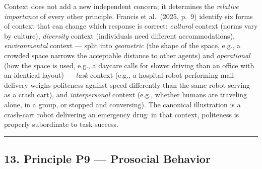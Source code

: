 \documentclass[utf8]{frontiers_suppmat} %
\newenvironment{Shaded}{\begin{shaded}}{\end{shaded}}
\begin{document}
Context does not add a new independent concern; it determines the
\emph{relative importance} of every other principle. Francis et
al.~(2025, p.~9) identify six forms of context that can change which
response is correct: \emph{cultural} context (norms vary by culture),
\emph{diversity} context (individuals need different accommodations),
\emph{environmental} context --- split into \emph{geometric} (the shape
of the space, e.g., a crowded space narrows the acceptable distance to
other agents) and \emph{operational} (how the space is used, e.g., a
daycare calls for slower driving than an office with an identical
layout) --- \emph{task} context (e.g., a hospital robot performing mail
delivery weighs politeness against speed differently than the same robot
serving as a crash cart), and \emph{interpersonal} context (e.g.,
whether humans are traveling alone, in a group, or stopped and
conversing). The canonical illustration is a crash-cart robot delivering
an emergency drug: in that context, politeness is properly subordinate
to task success.

\begin{Shaded}
\begin{Highlighting}[]
\KeywordTok{:}
\KeywordTok{:}
\KeywordTok{:}
\KeywordTok{: }\CharTok{\textgreater{}}
\KeywordTok{:}
\AttributeTok{  }\KeywordTok{:}
\AttributeTok{    }\KeywordTok{{-}}\AttributeTok{ }
\AttributeTok{    }\KeywordTok{{-}}\AttributeTok{ }
\AttributeTok{  }\KeywordTok{:}
\AttributeTok{    }\KeywordTok{{-}}\AttributeTok{ }
\AttributeTok{    }\KeywordTok{{-}}\AttributeTok{ }
\end{Highlighting}
\end{Shaded}

\begin{center}\rule{0.5\linewidth}{0.5pt}\end{center}

\subsection{13. Principle P9 --- Prosocial
Behavior}\label{principle-p9-prosocial-behavior}
\end{document}
